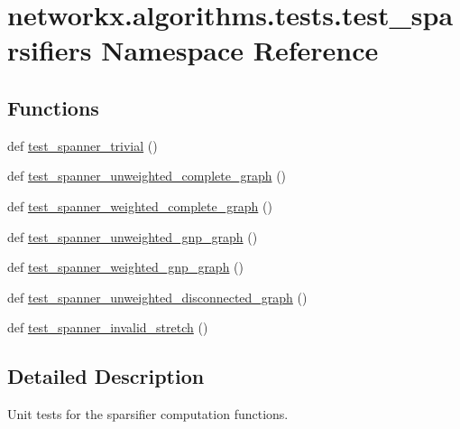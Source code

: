 \hypertarget{namespacenetworkx_1_1algorithms_1_1tests_1_1test__sparsifiers}{}\section{networkx.\+algorithms.\+tests.\+test\+\_\+sparsifiers Namespace Reference}
\label{namespacenetworkx_1_1algorithms_1_1tests_1_1test__sparsifiers}
\subsection*{Functions}
\begin{DoxyCompactItemize}
\item 
def \hyperlink{namespacenetworkx_1_1algorithms_1_1tests_1_1test__sparsifiers_a05dc1e0844995ee2fb500fb30a15d9a8}{test\+\_\+spanner\+\_\+trivial} ()
\item 
def \hyperlink{namespacenetworkx_1_1algorithms_1_1tests_1_1test__sparsifiers_a2569fb45ad3c33fa2a4c3b5a8e7e2173}{test\+\_\+spanner\+\_\+unweighted\+\_\+complete\+\_\+graph} ()
\item 
def \hyperlink{namespacenetworkx_1_1algorithms_1_1tests_1_1test__sparsifiers_aeb20766b774319864d610b0871cd64e6}{test\+\_\+spanner\+\_\+weighted\+\_\+complete\+\_\+graph} ()
\item 
def \hyperlink{namespacenetworkx_1_1algorithms_1_1tests_1_1test__sparsifiers_a695e9f8c2ecd63378ea1921ca12c715d}{test\+\_\+spanner\+\_\+unweighted\+\_\+gnp\+\_\+graph} ()
\item 
def \hyperlink{namespacenetworkx_1_1algorithms_1_1tests_1_1test__sparsifiers_a0aa384290f9a19f8bfd59f305e943f8a}{test\+\_\+spanner\+\_\+weighted\+\_\+gnp\+\_\+graph} ()
\item 
def \hyperlink{namespacenetworkx_1_1algorithms_1_1tests_1_1test__sparsifiers_aadb854009ae9826b3f88a0d296958a7e}{test\+\_\+spanner\+\_\+unweighted\+\_\+disconnected\+\_\+graph} ()
\item 
def \hyperlink{namespacenetworkx_1_1algorithms_1_1tests_1_1test__sparsifiers_afa3cfa69f62bed199fdca93bc730777a}{test\+\_\+spanner\+\_\+invalid\+\_\+stretch} ()
\end{DoxyCompactItemize}


\subsection{Detailed Description}
\begin{DoxyVerb}Unit tests for the sparsifier computation functions.\end{DoxyVerb}
 

